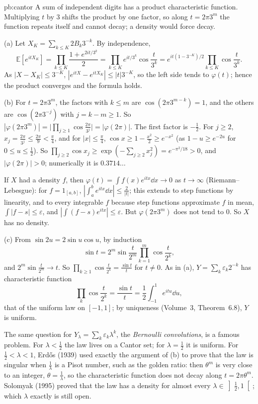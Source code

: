 \begin{solution}{pb:cantor}
\idea A sum of independent digits has a product characteristic function. Multiplying $t$ by $3$ shifts the product by one factor,
so along $t=2\pi3^m$ the function repeats itself and cannot decay; a density would force decay.

\writeup (a) Let $X_K=\sum_{k\le K}2B_k3^{-k}$. By independence,
\[
\mathbb E[e^{itX_K}]=\prod_{k\le K}\frac{1+e^{2it/3^k}}2=\prod_{k\le K}e^{it/3^k}\cos\frac t{3^k}=e^{it(1-3^{-K})/2}\prod_{k\le K}\cos\frac t{3^k}.
\]
As $|X-X_K|\le3^{-K}$, $|e^{itX}-e^{itX_K}|\le|t|3^{-K}$, so the left side tends to $\varphi(t)$; hence the product converges and the formula holds.

(b) For $t=2\pi3^m$, the factors with $k\le m$ are $\cos(2\pi3^{m-k})=1$, and the others are $\cos(2\pi3^{-j})$ with $j=k-m\ge1$. So
$|\varphi(2\pi3^m)|=\bigl|\prod_{j\ge1}\cos\frac{2\pi}{3^j}\bigr|=|\varphi(2\pi)|$. The first factor is $-\frac12$. For $j\ge2$, $x_j=\frac{2\pi}{3^j}\le\frac{2\pi}9<\frac\pi4$, and for
$|x|\le\frac\pi4$, $\cos x\ge1-\frac{x^2}2\ge e^{-x^2}$ (as $1-u\ge e^{-2u}$ for $0\le u\le\frac12$). So $\prod_{j\ge2}\cos x_j\ge\exp(-\sum_{j\ge2}x_j^2)=e^{-\pi^2/18}>0$,
and $|\varphi(2\pi)|>0$; numerically it is $0.3714\ldots$

If $X$ had a density $f$, then $\varphi(t)=\int f(x)e^{itx}\dd x\to0$ as $t\to\infty$ (Riemann--Lebesgue): for $f=1_{[a,b]}$, $|\int_a^be^{itx}\dd x|\le\frac2{|t|}$; this
extends to step functions by linearity, and to every integrable $f$ because step functions approximate $f$ in mean,
$\int|f-s|\le\varepsilon$, and $|\int(f-s)e^{itx}|\le\varepsilon$. But $\varphi(2\pi3^m)$ does not tend to $0$. So $X$ has no density.

(c) From $\sin2u=2\sin u\cos u$, by induction
\[
\sin t=2^m\sin\frac t{2^m}\prod_{k=1}^m\cos\frac t{2^k},
\]
and $2^m\sin\frac t{2^m}\to t$. So $\prod_{k\ge1}\cos\frac t{2^k}=\frac{\sin t}t$ for $t\ne0$. As in (a), $Y=\sum_k\varepsilon_k2^{-k}$ has characteristic function
\[
\prod_k\cos\frac t{2^k}=\frac{\sin t}t=\frac12\int_{-1}^1e^{itu}\dd u,
\]
that of the
uniform law on $[-1,1]$; by uniqueness (Volume~3, Theorem~6.8), $Y$ is uniform.

\leads The same question for $Y_\lambda=\sum_k\varepsilon_k\lambda^k$, the \emph{Bernoulli convolutions}, is a famous problem. For $\lambda<\frac12$ the law lives on a
Cantor set; for $\lambda=\frac12$ it is uniform. For $\frac12<\lambda<1$, Erdős (1939) used exactly the argument of (b) to prove that the law is
singular when $\frac1\lambda$ is a Pisot number, such as the golden ratio: then $\theta^m$ is very close to an integer, $\theta=\frac1\lambda$, so the
characteristic function does not decay along $t=2\pi\theta^m$. Solomyak (1995) proved that the law has a density for almost every
$\lambda\in\left]\frac12,1\right[$; which $\lambda$ exactly is still open.
\end{solution}

